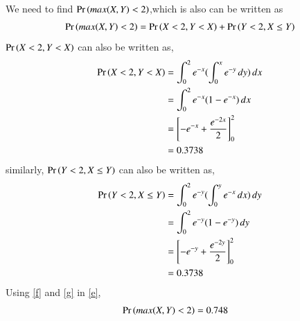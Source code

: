 \documentclass[journal,12pt,twocolumn]{IEEEtran}
\begin{document}
We need to find $\Pr\left( max(X,Y)<2\right)$,which is also can be written as
\begin{align}
   \Pr\left(max(X,Y)<2\right) =\Pr\left(X<2 ,Y<X\right) + \Pr\left(Y<2 ,X\le Y\right) \label{e}
 \end{align}
 $\Pr\left(X<2 ,Y<X\right)$ can also be written as,
 \begin{align}
  \Pr\left(X<2 ,Y<X\right) &=\int_{0}^{2}{e^{-x}(\int_{0}^{x}{e^{-y}}\,dy)}\,dx\\
  &= \int_{0}^{2}{e^{-x}(1-e^{-x})}\,dx\\
   &= \left[-e^{-x} +\frac{e^{-2x}}{2}\right]_0^2\\
    &=0.3738 \label{f}
\end{align}
similarly, $\Pr\left(Y<2 ,X\le Y\right)$ can also be written as,
\begin{align}
  \Pr\left(Y<2 ,X\le Y\right) &=\int_{0}^{2}{e^{-y}(\int_{0}^{y}{e^{-x}}\,dx)}\,dy\\
  &= \int_{0}^{2}{e^{-y}(1-e^{-y})}\,dy\\
   &= \left[-e^{-y} +\frac{e^{-2y}}{2}\right]_0^2\\
    &=0.3738 \label{g}
\end{align}
Using \eqref{f} and \eqref{g} in \eqref{e},
\begin{align}
 \Pr\left(max(X,Y)<2\right) &=0.748 
\end{align}
\end{document}
